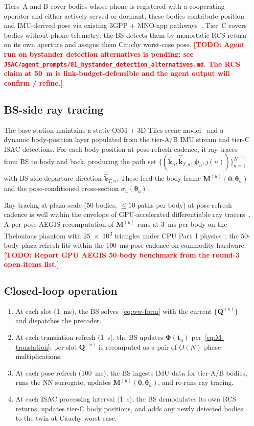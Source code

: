\documentclass[journal,twoside,onecolumn]{IEEEtran}
\theoremstyle{definition}
\newcommand{\TODO}[1]{\textcolor{red}{\textbf{[TODO: #1]}}}
\newcommand{\khat}{\hat{\bm{k}}}
\newcommand{\Q}{\mathbf{Q}}
\newcommand{\Mmat}{\mathbf{M}}
\newcommand{\Phimat}{\mathbf{\Phi}}
\begin{document}
Tiers~A and B cover bodies whose phone is registered with a
cooperating operator and either actively served or dormant; these
bodies contribute position and IMU-derived pose via existing
3GPP + MNO-app pathways~\cite{X75Whitepaper}. Tier~C covers bodies
without phone telemetry: the BS detects them by monostatic RCS
return on its own aperture and assigns them Cauchy worst-case
pose. \TODO{Agent run on bystander detection alternatives is
pending; see
\texttt{JSAC/agent\_prompts/01\_bystander\_detection\_alternatives.md}.
The RCS claim at 50~m is link-budget-defensible and the agent
output will confirm / refine.}

\subsection{BS-side ray tracing}

The base station maintains a static OSM + 3D Tiles scene
model~\cite{Sionna,DiffeRT} and a dynamic body-position layer
populated from the tier-A/B IMU stream and tier-C ISAC detections.
For each body position at pose-refresh cadence, it ray-traces from
BS to body and back, producing the path set
$\{(\khat_n,\hat{\khat}_{T,n},\bm\psi_n,j(n))\}_{n=1}^{N^{(u)}}$
with BS-side departure direction $\hat{\khat}_{T,n}$. These feed
the body-frame $\Mmat^{(u)}(\bm{0},\bm\theta_u)$ and the
pose-conditioned cross-section $\sigma_u(\bm\theta_u)$.

Ray tracing at plaza scale (50 bodies, $\le 10$ paths per body) at
pose-refresh cadence is well within the envelope of
GPU-accelerated differentiable ray
tracers~\cite{Sionna,DiffeRT}. A per-pose AEGIS recomputation of
$\Mmat^{(u)}$ runs at \SI{3}{ms} per body on the Thelonious
phantom with \num{25e3} triangles under CPU Part~I
physics~\cite{WydaegheMonograph}; the 50-body plaza refresh fits
within the \SI{100}{ms} pose cadence on commodity hardware.
\TODO{Report GPU AEGIS 50-body benchmark from the round-3
open-items list.}

\subsection{Closed-loop operation}

\begin{enumerate}
\item
At each slot (\SI{1}{ms}), the BS solves~\eqref{eq:ww-form} with
the current $\{\Q^{(u)}\}$ and dispatches the precoder.
\item
At each translation refresh (\SI{1}{s}), the BS updates
$\Phimat(\mathbf{t}_u)$ per~\eqref{eq:M-translation}; per-slot
$\Q^{(u)}$ is recomputed as a pair of $O(N)$ phase
multiplications.
\item
At each pose refresh (\SI{100}{ms}), the BS ingests IMU data for
tier-A/B bodies, runs the NN surrogate, updates
$\Mmat^{(u)}(\bm{0},\bm\theta_u)$, and re-runs ray tracing.
\item
At each ISAC processing interval (\SI{1}{s}), the BS demodulates
its own RCS returns, updates tier-C body positions, and adds any
newly detected bodies to the twin at Cauchy worst case.
\end{enumerate}
\end{document}
